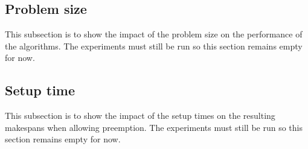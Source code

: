 \subsection{Problem size}
This subsection is to show the impact of the problem size on the performance of the algorithms. The experiments must still be run so this section remains empty for now.

\subsection{Setup time}
This subsection is to show the impact of the setup times on the resulting makespans when allowing preemption. The experiments must still be run so this section remains empty for now.